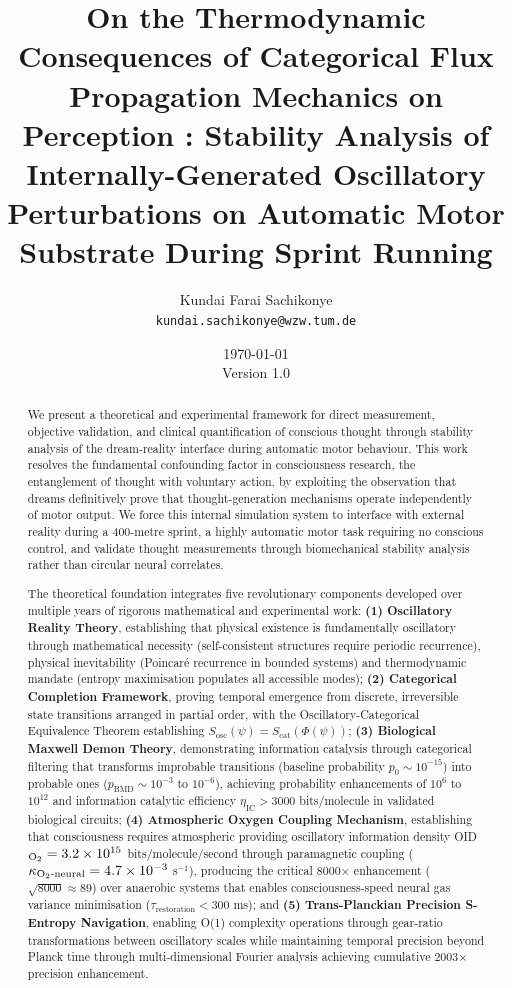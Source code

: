 \documentclass[11pt,onecolumn]{article}
\title{\textbf{On the Thermodynamic Consequences of Categorical Flux Propagation Mechanics on Perception :  Stability Analysis of Internally-Generated Oscillatory Perturbations on Automatic Motor Substrate During Sprint Running}}
\author{
Kundai Farai Sachikonye\\
\texttt{kundai.sachikonye@wzw.tum.de}
}
\date{\today\\[1em]Version 1.0}
\begin{document}
\maketitle

\begin{abstract}
We present a theoretical and experimental framework for direct measurement, objective validation, and clinical quantification of conscious thought through stability analysis of the dream-reality interface during automatic motor behaviour. This work resolves the fundamental confounding factor in consciousness research, the entanglement of thought with voluntary action, by exploiting the observation that dreams definitively prove that thought-generation mechanisms operate independently of motor output. We force this internal simulation system to interface with external reality during a 400-metre sprint, a highly automatic motor task requiring no conscious control, and validate thought measurements through biomechanical stability analysis rather than circular neural correlates.

The theoretical foundation integrates five revolutionary components developed over multiple years of rigorous mathematical and experimental work: \textbf{(1) Oscillatory Reality Theory}, establishing that physical existence is fundamentally oscillatory through mathematical necessity (self-consistent structures require periodic recurrence), physical inevitability (Poincar\'e recurrence in bounded systems) and thermodynamic mandate (entropy maximisation populates all accessible modes); \textbf{(2) Categorical Completion Framework}, proving temporal emergence from discrete, irreversible state transitions arranged in partial order, with the Oscillatory-Categorical Equivalence Theorem establishing $S_{\text{osc}}(\psi) = S_{\text{cat}}(\Phi(\psi))$; \textbf{(3) Biological Maxwell Demon Theory}, demonstrating information catalysis through categorical filtering that transforms improbable transitions (baseline probability $p_0 \sim 10^{-15}$) into probable ones ($p_{\text{BMD}} \sim 10^{-3}$ to $10^{-6}$), achieving probability enhancements of $10^6$ to $10^{12}$ and information catalytic efficiency $\eta_{\text{IC}} > 3000$ bits/molecule in validated biological circuits; \textbf{(4) Atmospheric Oxygen Coupling Mechanism}, establishing that consciousness requires atmospheric  providing oscillatory information density OID$_{\ce{O2}} = 3.2 \times 10^{15}$ bits/molecule/second through paramagnetic coupling ($\kappa_{\ce{O2}\text{-neural}} = 4.7 \times 10^{-3}$ s$^{-1}$), producing the critical 8000$\times$ enhancement ($\sqrt{8000} \approx 89$) over anaerobic systems that enables consciousness-speed neural gas variance minimisation ($\tau_{\text{restoration}} < 300$ ms); and \textbf{(5) Trans-Planckian Precision S-Entropy Navigation}, enabling O(1) complexity operations through gear-ratio transformations between oscillatory scales while maintaining temporal precision beyond Planck time through multi-dimensional Fourier analysis achieving cumulative 2003$\times$ precision enhancement.


\end{abstract}
\end{document}
